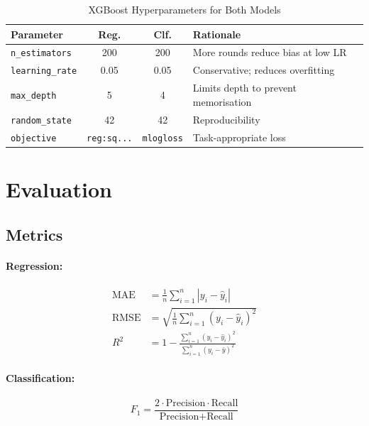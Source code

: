 \documentclass[12pt,a4paper]{article}
\begin{document}
\begin{table}[H]
\centering
\caption{XGBoost Hyperparameters for Both Models}
\begin{tabular}{@{} l c c p{5.5cm} @{}}
\toprule
\textbf{Parameter} & \textbf{Reg.} & \textbf{Clf.} & \textbf{Rationale} \\
\midrule
\texttt{n\_estimators}  & 200  & 200  & More rounds reduce bias at low LR \\
\texttt{learning\_rate} & 0.05 & 0.05 & Conservative; reduces overfitting \\
\texttt{max\_depth}     & 5    & 4    & Limits depth to prevent memorisation \\
\texttt{random\_state}  & 42   & 42   & Reproducibility \\
\texttt{objective}      & \texttt{reg:sq...} & \texttt{mlogloss} & Task-appropriate loss \\
\bottomrule
\end{tabular}
\end{table}

\section{Evaluation}

\subsection{Metrics}

\paragraph{Regression:}
\begin{align}
    \text{MAE}  &= \frac{1}{n}\sum_{i=1}^{n}|y_i - \hat{y}_i|
    \label{eq:mae}\\[4pt]
    \text{RMSE} &= \sqrt{\frac{1}{n}\sum_{i=1}^{n}(y_i - \hat{y}_i)^2}
    \label{eq:rmse}\\[4pt]
    R^2         &= 1 - \frac{\displaystyle\sum_{i=1}^{n}(y_i - \hat{y}_i)^2}
                            {\displaystyle\sum_{i=1}^{n}(y_i - \bar{y})^2}
    \label{eq:r2}
\end{align}

\paragraph{Classification:}
\begin{equation}
    F_1 = \frac{2 \cdot \text{Precision} \cdot \text{Recall}}
               {\text{Precision} + \text{Recall}}
    \label{eq:f1}
\end{equation}
\end{document}
